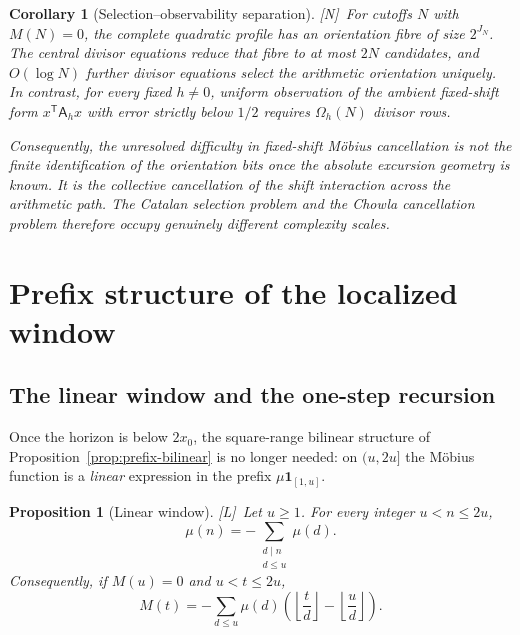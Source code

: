 \documentclass[11pt]{amsart}
\numberwithin{equation}{section}
\theoremstyle{plain}
\newtheorem{proposition}[theorem]{Proposition}
\newtheorem{corollary}[theorem]{Corollary}
\theoremstyle{definition}
\theoremstyle{remark}
\newcommand{\tagN}{\textup{[N]}}
\newcommand{\tagL}{\textup{[L]}}
\begin{document}
\begin{corollary}[Selection--observability separation]
\label{cor:selection-observability-separation}
\tagN\ For cutoffs $N$ with $M(N)=0$, the complete quadratic profile has an orientation fibre of size $2^{J_N}$.  The central divisor equations reduce that fibre to at most $2N$ candidates, and $O(\log N)$ further divisor equations select the arithmetic orientation uniquely.  In contrast, for every fixed $h\ne0$, uniform observation of the ambient fixed-shift form $x^{\mathsf T}\mathsf A_hx$ with error strictly below $1/2$ requires $\Omega_h(N)$ divisor rows.

Consequently, the unresolved difficulty in fixed-shift M\"obius cancellation is not the finite identification of the orientation bits once the absolute excursion geometry is known.  It is the collective cancellation of the shift interaction across the arithmetic path.  The Catalan selection problem and the Chowla cancellation problem therefore occupy genuinely different complexity scales.
\end{corollary}


\section{Prefix structure of the localized window}
\label{sec:prefix}

\subsection{The linear window and the one-step recursion}
\label{subsec:linear-window}

Once the horizon is below $2x_0$, the square-range bilinear structure of
Proposition~\ref{prop:prefix-bilinear} is no longer needed: on $(u,2u]$ the
M\"obius function is a \emph{linear} expression in the prefix
$\mu\mathbf 1_{[1,u]}$.

\begin{proposition}[Linear window]
\label{prop:linear-window}
\tagL\ Let $u\ge1$. For every integer $u<n\le2u$,
\begin{equation}
\label{eq:linear-window-mu}
\mu(n)=-\sum_{\substack{d\mid n\\ d\le u}}\mu(d).
\end{equation}
Consequently, if $M(u)=0$ and $u<t\le2u$,
\begin{equation}
\label{eq:linear-window-M}
M(t)=-\sum_{d\le u}\mu(d)\left(\left\lfloor\frac td\right\rfloor
-\left\lfloor\frac ud\right\rfloor\right).
\end{equation}
\end{proposition}
\end{document}
